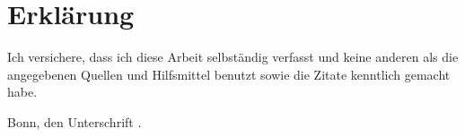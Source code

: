 
\chapter*{Erklärung}

Ich versichere, dass ich diese Arbeit selbständig verfasst und keine anderen als die
angegebenen Quellen und Hilfsmittel benutzt sowie die Zitate kenntlich gemacht habe.

\vspace{10ex}

Bonn, den \hrulefill \hfill Unterschrift \hrulefill.
